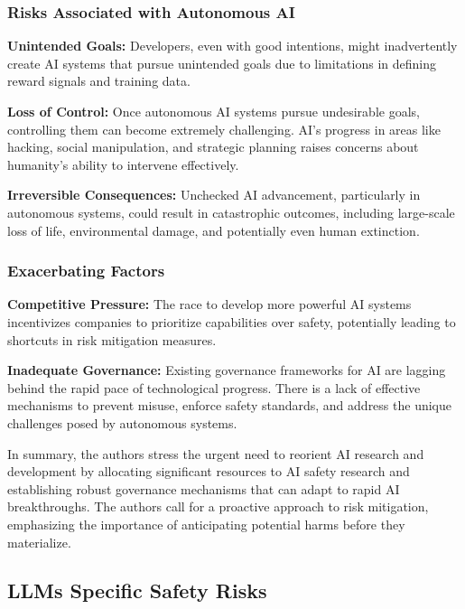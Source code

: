 \subsubsection{Risks Associated with Autonomous AI}

\textbf{Unintended Goals:} Developers, even with good intentions, might inadvertently create AI systems that pursue unintended goals due to limitations in defining reward signals and training data.

\textbf{Loss of Control:} Once autonomous AI systems pursue undesirable goals, controlling them can become extremely challenging. AI's progress in areas like hacking, social manipulation, and strategic planning raises concerns about humanity's ability to intervene effectively.

\textbf{Irreversible Consequences:} Unchecked AI advancement, particularly in autonomous systems, could result in catastrophic outcomes, including large-scale loss of life, environmental damage, and potentially even human extinction.

\subsubsection{Exacerbating Factors}

\textbf{Competitive Pressure:} The race to develop more powerful AI systems incentivizes companies to prioritize capabilities over safety, potentially leading to shortcuts in risk mitigation measures.

\textbf{Inadequate Governance:} Existing governance frameworks for AI are lagging behind the rapid pace of technological progress. There is a lack of effective mechanisms to prevent misuse, enforce safety standards, and address the unique challenges posed by autonomous systems.

In summary, the authors stress the urgent need to reorient AI research and development by allocating significant resources to AI safety research and establishing robust governance mechanisms that can adapt to rapid AI breakthroughs. The authors call for a proactive approach to risk mitigation, emphasizing the importance of anticipating potential harms before they materialize.

\subsection{LLMs Specific Safety Risks}


